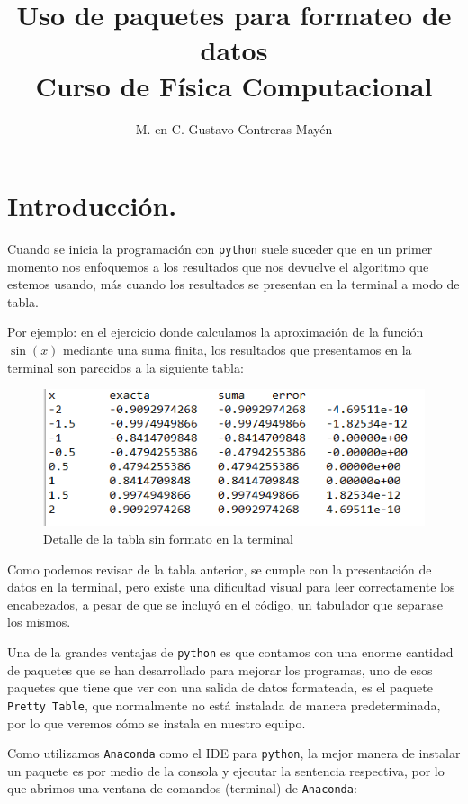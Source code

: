 \documentclass[11pt]{article}
\title{Uso de paquetes para formateo de datos \\ Curso de Física Computacional}
\author{M. en C. Gustavo Contreras Mayén}
\date{ }
\newcommand{\letraconsola}[1]{\texttt{#1}}
\begin{document}
\maketitle
\fontsize{14}{20}\selectfont
\section{Introducción.}
Cuando se inicia la programación con \letraconsola{python} suele suceder que en un primer momento nos enfoquemos a los resultados que nos devuelve el algoritmo que estemos usando, más cuando los resultados se presentan en la terminal a modo de tabla.
\par
Por ejemplo: en el ejercicio donde calculamos la aproximación de la función $\sin(x)$ mediante una suma finita, los resultados que presentamos en la terminal son parecidos a la siguiente tabla:
\begin{figure}[H]
    \centering
    \includegraphics{Imagenes/instalacion_paquete_python_03.png}
    \caption{Detalle de la tabla sin formato en la terminal}
    \label{fig:figura_01}
\end{figure}
Como podemos revisar de la tabla anterior, se cumple con la presentación de datos en la terminal, pero existe una dificultad visual para leer correctamente los encabezados, a pesar de que se incluyó en el código, un tabulador que separase los mismos.
\par
Una de la grandes ventajas de \letraconsola{python} es que contamos con una enorme cantidad de paquetes que se han desarrollado para mejorar los programas, uno de esos paquetes que tiene que ver con una salida de datos formateada, es el paquete \letraconsola{Pretty Table}, que normalmente no está instalada de manera predeterminada, por lo que veremos cómo se instala en nuestro equipo.
\par
Como utilizamos \letraconsola{Anaconda} como el IDE para \letraconsola{python}, la mejor manera de instalar un paquete es por medio de la consola y ejecutar la sentencia respectiva, por lo que abrimos una ventana de comandos (terminal) de \letraconsola{Anaconda}:
\end{document}
